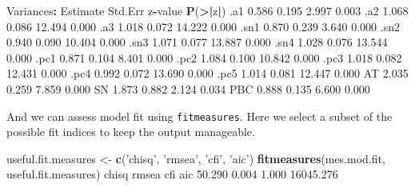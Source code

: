 \documentclass[]{article}
\newenvironment{Shaded}{\begin{snugshade}}{\end{snugshade}}
\newcommand{\ErrorTok}[1]{\textcolor[rgb]{0.64,0.00,0.00}{\textbf{#1}}}
\newcommand{\FloatTok}[1]{\textcolor[rgb]{0.00,0.00,0.81}{#1}}
\newcommand{\KeywordTok}[1]{\textcolor[rgb]{0.13,0.29,0.53}{\textbf{#1}}}
\newcommand{\NormalTok}[1]{#1}
\newcommand{\OperatorTok}[1]{\textcolor[rgb]{0.81,0.36,0.00}{\textbf{#1}}}
\newcommand{\StringTok}[1]{\textcolor[rgb]{0.31,0.60,0.02}{#1}}
\begin{document}
\begin{Shaded}
\begin{Highlighting}[]
\NormalTok{Variances}\OperatorTok{:}
\StringTok{                   }\NormalTok{Estimate  Std.Err  z}\OperatorTok{-}\NormalTok{value  }\KeywordTok{P}\NormalTok{(}\OperatorTok{>}\ErrorTok{|}\NormalTok{z}\OperatorTok{|}\NormalTok{)}
\NormalTok{   .a1                }\FloatTok{0.586}    \FloatTok{0.195}    \FloatTok{2.997}    \FloatTok{0.003}
\NormalTok{   .a2                }\FloatTok{1.068}    \FloatTok{0.086}   \FloatTok{12.494}    \FloatTok{0.000}
\NormalTok{   .a3                }\FloatTok{1.018}    \FloatTok{0.072}   \FloatTok{14.222}    \FloatTok{0.000}
\NormalTok{   .sn1               }\FloatTok{0.870}    \FloatTok{0.239}    \FloatTok{3.640}    \FloatTok{0.000}
\NormalTok{   .sn2               }\FloatTok{0.940}    \FloatTok{0.090}   \FloatTok{10.404}    \FloatTok{0.000}
\NormalTok{   .sn3               }\FloatTok{1.071}    \FloatTok{0.077}   \FloatTok{13.887}    \FloatTok{0.000}
\NormalTok{   .sn4               }\FloatTok{1.028}    \FloatTok{0.076}   \FloatTok{13.544}    \FloatTok{0.000}
\NormalTok{   .pc1               }\FloatTok{0.871}    \FloatTok{0.104}    \FloatTok{8.401}    \FloatTok{0.000}
\NormalTok{   .pc2               }\FloatTok{1.084}    \FloatTok{0.100}   \FloatTok{10.842}    \FloatTok{0.000}
\NormalTok{   .pc3               }\FloatTok{1.018}    \FloatTok{0.082}   \FloatTok{12.431}    \FloatTok{0.000}
\NormalTok{   .pc4               }\FloatTok{0.992}    \FloatTok{0.072}   \FloatTok{13.690}    \FloatTok{0.000}
\NormalTok{   .pc5               }\FloatTok{1.014}    \FloatTok{0.081}   \FloatTok{12.447}    \FloatTok{0.000}
\NormalTok{    AT                }\FloatTok{2.035}    \FloatTok{0.259}    \FloatTok{7.859}    \FloatTok{0.000}
\NormalTok{    SN                }\FloatTok{1.873}    \FloatTok{0.882}    \FloatTok{2.124}    \FloatTok{0.034}
\NormalTok{    PBC               }\FloatTok{0.888}    \FloatTok{0.135}    \FloatTok{6.600}    \FloatTok{0.000}
\end{Highlighting}
\end{Shaded}

And we can assess model fit using \texttt{fitmeasures}. Here we select a subset of the
possible fit indices to keep the output manageable.

\begin{Shaded}
\begin{Highlighting}[]
\NormalTok{useful.fit.measures <-}\StringTok{ }\KeywordTok{c}\NormalTok{(}\StringTok{'chisq'}\NormalTok{, }\StringTok{'rmsea'}\NormalTok{, }\StringTok{'cfi'}\NormalTok{, }\StringTok{'aic'}\NormalTok{)}
\KeywordTok{fitmeasures}\NormalTok{(mes.mod.fit, useful.fit.measures)}
\NormalTok{    chisq     rmsea       cfi       aic }
   \FloatTok{50.290}     \FloatTok{0.004}     \FloatTok{1.000} \FloatTok{16045.276} 
\end{Highlighting}
\end{Shaded}
\end{document}
